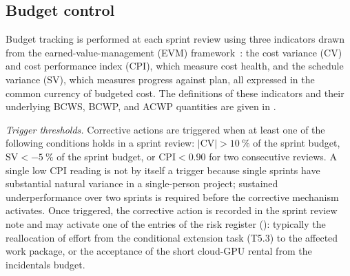 \subsection{Budget control}
\label{sec:mgmt-control}

Budget tracking is performed at each sprint review using three
indicators drawn from the earned-value-management (EVM)
framework~\cite{pmiBOKGuide2021}: the cost variance (CV) and cost
performance index (CPI), which measure cost health, and the schedule
variance (SV), which measures progress against plan, all expressed in
the common currency of budgeted cost.
The definitions of these indicators and their underlying BCWS, BCWP,
and ACWP quantities are given in .

\textit{Trigger thresholds.}
Corrective actions are triggered when at least one of the
following conditions holds in a sprint review:
$|\mathrm{CV}| > \SI{10}{\percent}$ of the sprint budget,
$\mathrm{SV} < -\SI{5}{\percent}$ of the sprint budget, or
$\mathrm{CPI} < 0.90$ for two consecutive reviews.
A single low CPI reading is not by itself a trigger because
single sprints have substantial natural variance in a
single-person project; sustained underperformance over two
sprints is required before the corrective mechanism activates.
Once triggered, the corrective action is recorded in the sprint
review note and may activate one of the entries of the risk
register (): typically the
reallocation of effort from the conditional extension task
(T5.3) to the affected work package, or the acceptance of the
short cloud-GPU rental from the incidentals budget.
